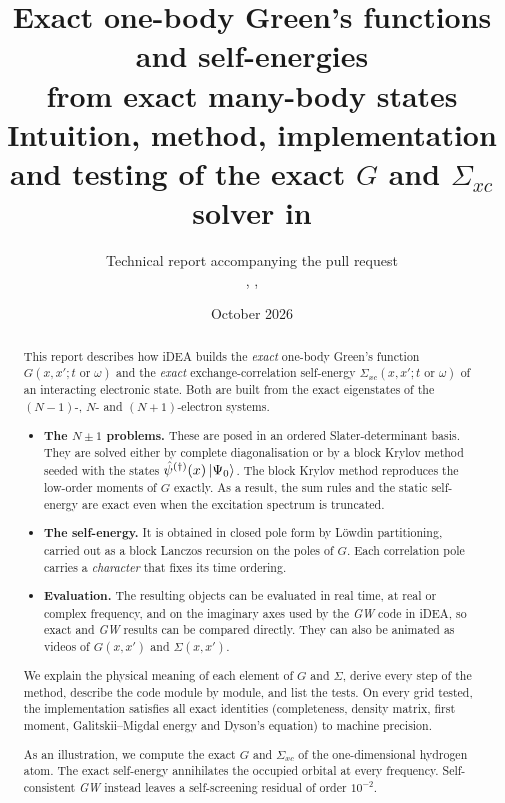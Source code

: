 \documentclass[11pt,a4paper]{article}
\title{\textbf{Exact one-body Green's functions and self-energies\\ from exact many-body states}\\[4pt]
\large Intuition, method, implementation and testing of the exact $G$ and $\Sigma_{xc}$ solver in \iDEA{}}
\author{Technical report accompanying the \iDEA{} pull request\\
\small \code{iDEA.methods.interacting.green\_function}, \code{iDEA.observables}, \code{iDEA.plotting}}
\date{October 2026}
\newcommand{\GW}{\textit{GW}}
\newcommand{\iDEA}{iDEA}
\begin{document}
\maketitle

\begin{abstract}
\noindent
This report describes how \iDEA{} builds the \emph{exact} one-body Green's function $G(x,x';t\text{ or }\omega)$ and the \emph{exact} exchange-correlation self-energy $\Sigma_{xc}(x,x';t\text{ or }\omega)$ of an interacting electronic state. Both are built from the exact eigenstates of the $(N-1)$-, $N$- and $(N+1)$-electron systems.

\begin{itemize}
\item \textbf{The $N\pm1$ problems.} These are posed in an ordered Slater-determinant basis. They are solved either by complete diagonalisation or by a block Krylov method seeded with the states $\hat\psi^{(\dagger)}(x)\ket{\Psi_0}$. The block Krylov method reproduces the low-order moments of $G$ exactly. As a result, the sum rules and the static self-energy are exact even when the excitation spectrum is truncated.
\item \textbf{The self-energy.} It is obtained in closed pole form by Löwdin partitioning, carried out as a block Lanczos recursion on the poles of $G$. Each correlation pole carries a \emph{character} that fixes its time ordering.
\item \textbf{Evaluation.} The resulting objects can be evaluated in real time, at real or complex frequency, and on the imaginary axes used by the \GW{} code in \iDEA{}, so exact and \GW{} results can be compared directly. They can also be animated as videos of $G(x,x')$ and $\Sigma(x,x')$.
\end{itemize}

We explain the physical meaning of each element of $G$ and $\Sigma$, derive every step of the method, describe the code module by module, and list the tests. On every grid tested, the implementation satisfies all exact identities (completeness, density matrix, first moment, Galitskii--Migdal energy and Dyson's equation) to machine precision.

As an illustration, we compute the exact $G$ and $\Sigma_{xc}$ of the one-dimensional hydrogen atom. The exact self-energy annihilates the occupied orbital at every frequency. Self-consistent \GW{} instead leaves a self-screening residual of order $10^{-2}$.
\end{abstract}
\end{document}
